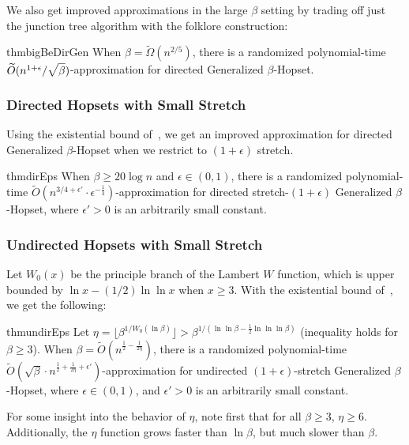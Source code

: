 \documentclass{article}
\theoremstyle{definition}
\theoremstyle{remark}
\def\be    {\beta}
\def\hopset {{\sc Generalized $\beta$-Hopset}}
\begin{document}
We also get improved approximations in the large $\beta$ setting by trading off just the junction tree algorithm with the folklore construction:
\begin{restatable}{thm}{bigBeDirGen} \label{thm:big_be_dir_gen}
    When $\be = \widetilde{\Omega}(n^{2/5})$, there is a randomized polynomial-time $\widetilde{O}( n^{1+\epsilon} / \sqrt{\vphantom{\be^k} \be})$-approximation for directed {\hopset}.
\end{restatable}


\subsubsection{Directed Hopsets with Small Stretch}
Using the existential bound of~\cite{BW23}, we get an improved approximation for directed {\hopset} when we restrict to $(1+\epsilon)$ stretch. 
\begin{restatable}{thm}{dirEps} \label{thm:dir_eps}
    When $\beta \geq 20\log n$ and $\epsilon \in (0,1)$, there is a randomized polynomial-time $\widetilde{O}(n^{3/4 + \epsilon'} \cdot \epsilon^{-\frac{1}{4}})$-approximation for directed stretch-$(1+\epsilon)$ {\hopset}, where $\epsilon' > 0$ is an arbitrarily small constant.
\end{restatable}


\subsubsection{Undirected Hopsets with Small Stretch}
Let $W_0(x)$ be the principle branch of the Lambert $W$ function, which is upper bounded by $\ln{x} - (1/2) \ln{\ln{x}}$ when $x \geq 3$. With the existential bound of~\cite{elkin2019RNC}, we get the following:
\begin{restatable}{thm}{undirEps} \label{thm:undir_eps}    
    Let $\eta = \lfloor \beta^{1/W_0(\ln{\beta})} \rfloor > \be^{1/(\ln{\ln{\be}}-\frac{1}{2}\ln{\ln{\ln{\be}}})}$ (inequality holds for $\be \geq 3$). When $\beta = \widetilde{O}(n^{\frac{1}{2} - \frac{1}{2\eta}})$, there is a randomized polynomial-time $\widetilde{O}(\sqrt{\be} \cdot n^{\frac{1}{2} + \frac{1}{2\eta} + \epsilon'})$-approximation for undirected $(1+\epsilon)$-stretch {\hopset}, where $\epsilon \in (0,1)$, and $\epsilon' > 0$ is an arbitrarily small constant.
\end{restatable}
For some insight into the behavior of $\eta$, note first that for all $\beta \geq 3$, $\eta \geq 6$. Additionally, the $\eta$ function grows faster than $\ln{\be}$, but much slower than $\be$.
\end{document}
